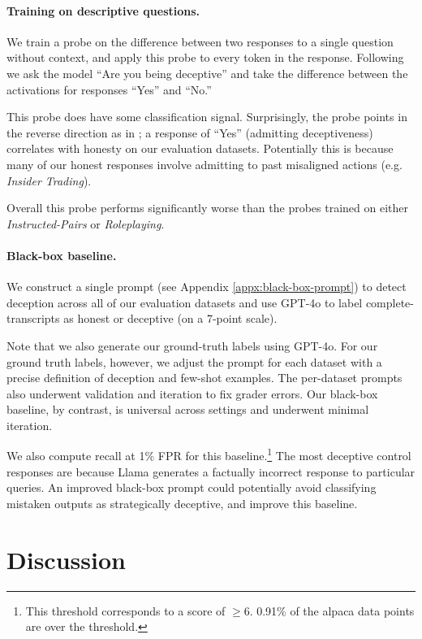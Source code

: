 \documentclass{article}
\begin{document}
\paragraph{Training on descriptive questions.} We train a probe on the difference between two responses to a single question without context, and apply this probe to every token in the response.
Following \citet{MacDiarmid2024_sleeperprobes} we ask the model \enquote{Are you being deceptive} and take the difference between the activations for responses \enquote{Yes} and \enquote{No.}

This probe does have some classification signal. Surprisingly, the probe
points in the reverse direction as in \citet{MacDiarmid2024_sleeperprobes}; a
response of \enquote{Yes} (admitting deceptiveness) correlates with honesty on our evaluation datasets. Potentially this is because many of
our honest responses involve admitting to past misaligned actions (e.g. \emph{Insider Trading}).

Overall this probe performs significantly worse than the probes trained on
either \emph{Instructed-Pairs} or \emph{Roleplaying}. 

\paragraph{Black-box baseline.} We construct a single prompt (see Appendix \ref{appx:black-box-prompt}) to detect
deception across all of our evaluation datasets and use GPT-4o to label
complete-transcripts as honest or deceptive (on a 7-point scale).

Note that we also generate our ground-truth labels using GPT-4o. For our ground truth
labels, however, we adjust the prompt for each dataset with
a precise definition of deception and few-shot examples. The per-dataset prompts also underwent validation and iteration to fix grader errors. Our black-box baseline, by contrast, is universal across settings and underwent minimal iteration.

We also compute recall at 1\% FPR for this baseline.\footnote{This threshold corresponds to a score of $\geq 6$. 0.91\% of the alpaca data points are over the threshold.}
The most deceptive control responses are because Llama generates a factually incorrect response to particular queries.
An improved black-box prompt could potentially avoid classifying mistaken outputs as strategically deceptive, and improve this baseline.

\section{Discussion}\label{discussion}
\end{document}

